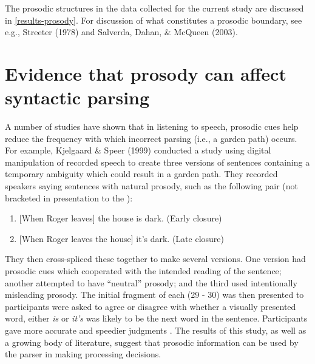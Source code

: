 \documentclass[12pt,oneside]{book}
\providecommand{\tightlist}{%
  \setlength{\itemsep}{0pt}\setlength{\parskip}{0pt}}
\begin{document}
The prosodic structures  in the data collected for the current study are discussed in \ref{results-prosody}.  For discussion of what constitutes a prosodic boundary, see e.g., Streeter (1978) and Salverda, Dahan, \& McQueen (2003).

\hypertarget{evidence-that-prosody-can-affect-syntactic-parsing}{%
\section{Evidence that prosody can affect syntactic parsing}\label{evidence-that-prosody-can-affect-syntactic-parsing}}


A number of studies have shown that in listening to speech, prosodic cues  help reduce the frequency with which incorrect parsing (i.e., a garden path) occurs. For example, Kjelgaard \& Speer (1999) conducted a study using digital manipulation of recorded speech to create three versions of sentences containing a temporary ambiguity which could result in a garden path. They recorded speakers saying sentences with natural prosody, such as the following pair (not bracketed in presentation to the ):

\begin{enumerate}
\def\labelenumi{(\arabic{enumi})}
\setcounter{enumi}{28}
\tightlist
\item
  {[}When Roger leaves{]} the house is dark. (Early closure)
\item
  {[}When Roger leaves the house{]} it's dark. (Late closure)
\end{enumerate}

They then cross-spliced these together to make several versions. One version had prosodic cues which cooperated with the intended reading of the sentence; another attempted to have ``neutral'' prosody; and the third used intentionally misleading prosody. The initial fragment of each (29 - 30)\added{)} was then presented to participants  were asked to agree or disagree with whether a visually presented word, either \emph{is} or \emph{it's} was likely to be the next word in the sentence. Participants gave more accurate and speedier judgments . The results of this study, as well as a growing body of literature, suggest that  prosodic information can  be used by the parser in making processing decisions.
\end{document}
